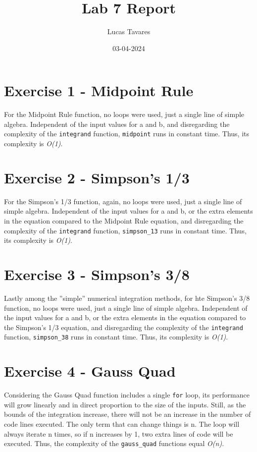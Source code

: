 \documentclass{article}
\title{Lab 7 Report}
\date{03-04-2024}
\author{Lucas Tavares}
\begin{document}
\maketitle


\newpage

\section{Exercise 1 - Midpoint Rule}

For the Midpoint Rule function, no loops were used, just a single line of simple algebra. Independent of the input values for a and b, and disregarding the complexity of the \texttt{integrand} function, \texttt{midpoint} runs in constant time. Thus, its complexity is \textit{O(1)}.

\section{Exercise 2 - Simpson's 1/3}

For the Simpson's 1/3 function, again, no loops were used, just a single line of simple algebra. Independent of the input values for a and b, or the extra elements in the equation compared to the Midpoint Rule equation, and disregarding the complexity of the \texttt{integrand} function, \texttt{simpson\_13} runs in constant time. Thus, its complexity is \textit{O(1)}.

\section{Exercise 3 - Simpson's 3/8}

Lastly among the ''simple'' numerical integration methods, for hte Simpson's 3/8 function, no loops were used, just a single line of simple algebra. Independent of the input values for a and b, or the extra elements in the equation compared to the Simpson's 1/3 equation, and disregarding the complexity of the \texttt{integrand} function, \texttt{simpson\_38} runs in constant time. Thus, its complexity is \textit{O(1)}.

\section{Exercise 4 - Gauss Quad}

Considering the Gauss Quad function includes a single \texttt{for} loop, its performance will grow linearly and in direct proportion to the size of the inputs. Still, as the bounds of the integration increase, there will not be an increase in the number of code lines executed. The only term that can change things is n. The loop will always iterate n times, so if n increases by 1, two extra lines of code will be executed. Thus, the complexity of the \texttt{gauss\_quad} functions equal \textit{O(n)}.
\end{document}
